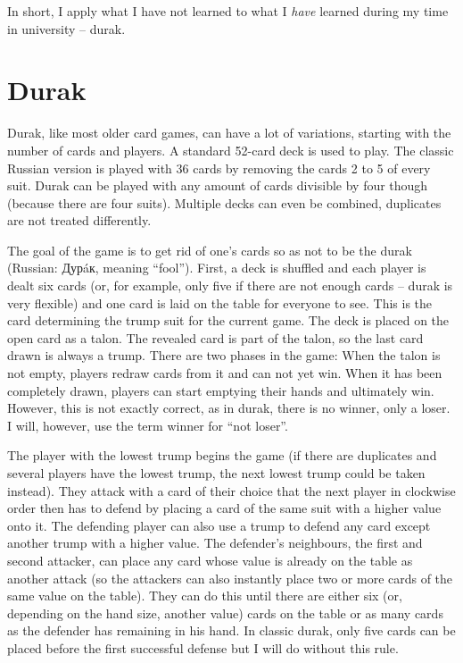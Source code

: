 \documentclass[a4paper,titlepage]{article}
\begin{document}
In short, I apply what I have not learned to what I \emph{have} learned during my time in university -- durak.

\newpage

\section{Durak}

Durak, like most older card games, can have a lot of variations, starting with the number of cards and players. A standard 52-card deck is used to play. The classic Russian version is played with 36 cards by removing the cards 2 to 5 of every suit. Durak can be played with any amount of cards divisible by four though (because there are four suits). Multiple decks can even be combined, duplicates are not treated differently.

The goal of the game is to get rid of one's cards so as not to be the durak (Russian: Дурáк, meaning ``fool''). First, a deck is shuffled and each player is dealt six cards (or, for example, only five if there are not enough cards -- durak is very flexible) and one card is laid on the table for everyone to see. This is the card determining the trump suit for the current game. The deck is placed on the open card as a talon. The revealed card is part of the talon, so the last card drawn is always a trump.
There are two phases in the game: When the talon is not empty, players redraw cards from it and can not yet win. When it has been completely drawn, players can start emptying their hands and ultimately win. However, this is not exactly correct, as in durak, there is no winner, only a loser. I will, however, use the term winner for ``not loser''. \medskip

The player with the lowest trump begins the game (if there are duplicates and several players have the lowest trump, the next lowest trump could be taken instead). They attack with a card of their choice that the next player in clockwise order then has to defend by placing a card of the same suit with a higher value onto it. The defending player can also use a trump to defend any card except another trump with a higher value. The defender's neighbours, the first and second attacker, can place any card whose value is already on the table as another attack (so the attackers can also instantly place two or more cards of the same value on the table). They can do this until there are either six (or, depending on the hand size, another value) cards on the table or as many cards as the defender has remaining in his hand. In classic durak, only five cards can be placed before the first successful defense but I will do without this rule.
\end{document}
